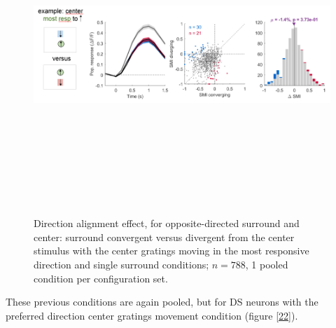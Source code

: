 \begin{figure}[H] \centering \includegraphics[width=12cm,height=12cm,keepaspectratio]{Figures/7.Results/finalPopulation/sel/diagrams/21.png} 
\caption{Direction alignment effect, for opposite-directed surround and center: surround convergent versus divergent from the center stimulus with the center gratings moving in the most responsive direction and single surround conditions;  $n=788$, 1 pooled condition per configuration set.} \label{21}
\end{figure}

These previous conditions are again pooled, but for DS neurons with the preferred direction center gratings movement condition (figure \ref{22}).

